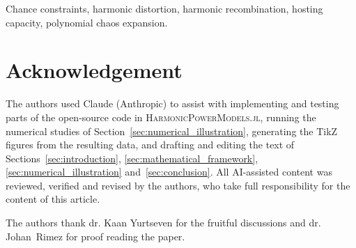 \documentclass[journal]{IEEEtran}
\begin{document}
\begin{IEEEkeywords}
Chance constraints, harmonic distortion, harmonic recombination, hosting capacity, polynomial chaos expansion.
\end{IEEEkeywords}

\IEEEpeerreviewmaketitle








% 

\section*{Acknowledgement}
The authors used Claude (Anthropic) to assist with implementing and testing parts of the open-source code in \textsc{HarmonicPowerModels.jl}, running the numerical studies of Section~\ref{sec:numerical_illustration}, generating the TikZ figures from the resulting data, and drafting and editing the text of Sections~\ref{sec:introduction}, \ref{sec:mathematical_framework}, \ref{sec:numerical_illustration} and~\ref{sec:conclusion}. All AI-assisted content was reviewed, verified and revised by the authors, who take full responsibility for the content of this article.

The authors thank dr. Kaan Yurtseven for the fruitful discussions and dr. Johan~Rimez for proof reading the paper.



\end{document}
